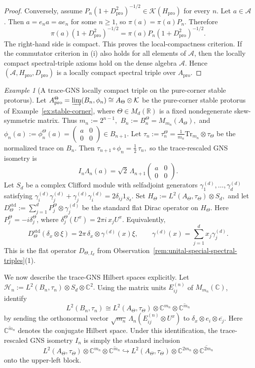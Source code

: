 \documentclass[11pt]{amsart}
\theoremstyle{definition}
\theoremstyle{remark}
\newtheorem{example}[theorem]{Example}
\newcommand{\R}{\mathbb{R}}
\newcommand{\C}{\mathbb C}
\newcommand{\K}{\ensuremath{\mathcal{K}}}
\newcommand{\Tr}{\mathrm{Tr}}
\newcommand{\ex}{\mathrm{pro}}
\begin{document}
\begin{proof}
Conversely, assume $P_n(1+D_{\ex}^2)^{-1/2}\in\mathcal K(H_{\ex})$
for every $n$. Let $a\in\mathcal A$. Then $a=e_na=ae_n$ for some $n\ge1$,
so $\pi(a)=\pi(a)P_n.$ Therefore
\[
\pi(a)(1+D_{\ex}^2)^{-1/2}
=
\pi(a)P_n(1+D_{\ex}^2)^{-1/2}.
\]
The right-hand side is compact. This proves the local-compactness criterion.
If the commutator criterion in \textup{(i)} also holds for all elements of
$\mathcal A$, then the locally compact spectral-triple axioms
hold on the dense algebra $\mathcal A$. Hence
$(\mathcal A,H_{\ex},D_{\ex})$ is a locally compact spectral triple over
$A_{\ex}$.\end{proof}

\begin{example}[A trace-GNS locally compact triple on the pure-corner stable protorus]
\label{ex:stable-corner-trace-gns-spectral}
Let $A_{\ex}^{\Theta}=\varinjlim(B_n,\phi_n)\cong A_\Theta\otimes\K$
be the pure-corner stable protorus of Example~\ref{ex:stable-corner}, where
\(\Theta\in M_d(\R)\) is a fixed nondegenerate skew-symmetric matrix. Thus $m_n:=2^{n-1},$
$B_n:=B_n^\Theta=M_{m_n}(A_\Theta),$
and $\phi_n(a):=\phi_n^\Theta(a)=
\begin{pmatrix}
a&0\\
0&0
\end{pmatrix}
\in
B_{n+1}.$
Let $\tau_n:=\tau_n^\Theta=\frac1{m_n}\Tr_{m_n}\otimes\tau_\Theta$
be the normalized trace on $B_n$. Then $\tau_{n+1}\circ\phi_n=\frac12\,\tau_n,$
so the trace-rescaled GNS isometry is
\[
I_n\Lambda_n(a)
=
\sqrt2\,\Lambda_{n+1}
\begin{pmatrix}
a&0\\
0&0
\end{pmatrix}.
\]
Let $S_d$ be a complex Clifford module with selfadjoint generators $\gamma_1^{(d)},\ldots,\gamma_d^{(d)}$
satisfying $\gamma_i^{(d)}\gamma_j^{(d)}+\gamma_j^{(d)}\gamma_i^{(d)}=2\delta_{ij}1_{S_d}.$
Set $H_\Theta:=L^2(A_\Theta,\tau_\Theta)\otimes S_d,$ and let $D_\Theta^{\mathrm{std}}:=\sum_{j=1}^d P_j^\Theta\otimes\gamma_j^{(d)}
$ be the standard flat Dirac operator on  $H_\Theta$. Here
$P_j^\Theta=-i\delta_j^\Theta$, where $\delta_j^\Theta(U^x)=2\pi i\,x_jU^x.$
Equivalently,
\[
D_\Theta^{\mathrm{std}}(\delta_x\otimes\xi)=2\pi\,\delta_x\otimes\gamma^{(d)}(x)\xi,
\qquad
\gamma^{(d)}(x)=\sum_{j=1}^d x_j\gamma_j^{(d)}.
\]
This is the flat operator $D_{\Theta,I_d}$ from
Observation~\ref{rem:unital-special-spectral-triples}\textup{(1)}.

We now describe the trace-GNS Hilbert spaces explicitly. Let $\mathcal H_n:=L^2(B_n,\tau_n)\otimes S_d\otimes\C^2.$
Using the matrix units $E_{ij}^{(n)}$ of $M_{m_n}(\C)$, identify
\[
L^2(B_n,\tau_n)
\cong
L^2(A_\Theta,\tau_\Theta)
\otimes
\C^{m_n}
\otimes
\overline{\C^{m_n}}
\]
by sending the orthonormal vector $\sqrt{m_n}\,\Lambda_n(E_{ij}^{(n)}\otimes U^x)$
to $\delta_x\otimes e_i\otimes\overline{e_j}.$ Here $\overline{\C^{m_n}}$ denotes the conjugate Hilbert space.
Under this identification, the trace-rescaled GNS isometry $I_n$ is simply the
standard inclusion
\[
L^2(A_\Theta,\tau_\Theta)\otimes\C^{m_n}\otimes\overline{\C^{m_n}}
\hookrightarrow
L^2(A_\Theta,\tau_\Theta)\otimes\C^{2m_n}\otimes\overline{\C^{2m_n}}
\]
onto the upper-left block.


\end{example}
\end{document}
